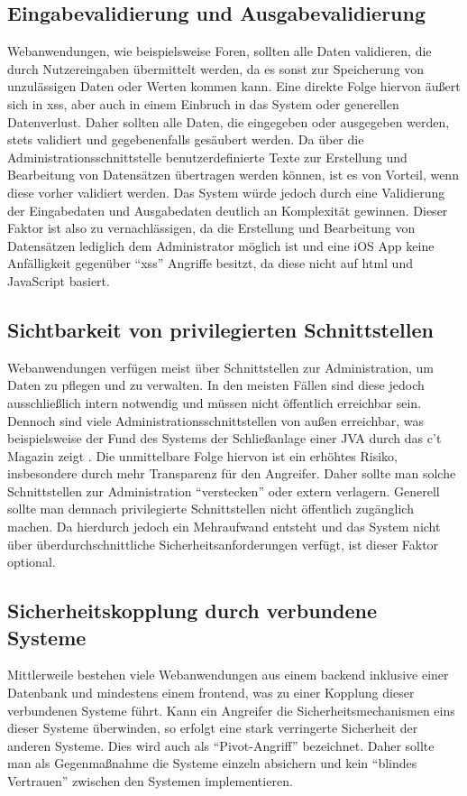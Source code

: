 \subsection{Eingabevalidierung und Ausgabevalidierung}
Webanwendungen, wie beispielsweise Foren, sollten alle Daten validieren, die durch Nutzereingaben übermittelt werden, da es sonst zur Speicherung von unzulässigen Daten oder Werten kommen kann. Eine direkte Folge hiervon äußert sich in \gls{xss}, aber auch in einem Einbruch in das System oder generellen Datenverlust.
Daher sollten alle Daten, die eingegeben oder ausgegeben werden, stets validiert und gegebenenfalls gesäubert werden.
Da über die Administrationsschnittstelle benutzerdefinierte Texte zur Erstellung und Bearbeitung von Datensätzen übertragen werden können, ist es von Vorteil, wenn diese vorher validiert werden. Das System würde jedoch durch eine Validierung der Eingabedaten und Ausgabedaten deutlich an Komplexität gewinnen. Dieser Faktor ist also zu vernachlässigen, da die Erstellung und Bearbeitung von Datensätzen lediglich dem Administrator möglich ist und eine iOS App keine Anfälligkeit gegenüber \enquote{xss} Angriffe besitzt, da diese nicht auf \gls{html} und JavaScript basiert.

\subsection{Sichtbarkeit von privilegierten Schnittstellen}
Webanwendungen verfügen meist über Schnittstellen zur Administration, um Daten zu pflegen und zu verwalten.
In den meisten Fällen sind diese jedoch ausschließlich intern notwendig und müssen nicht öffentlich erreichbar sein.
Dennoch sind viele Administrationsschnittstellen von außen erreichbar, was beispielsweise der Fund des Systems der Schließanlage einer JVA durch das c’t Magazin zeigt \cite[S.~78]{ct}.
Die unmittelbare Folge hiervon ist ein erhöhtes Risiko, insbesondere durch mehr Transparenz für den Angreifer.
Daher sollte man solche Schnittstellen zur Administration \enquote{verstecken} oder extern verlagern.
Generell sollte man demnach privilegierte Schnittstellen nicht öffentlich zugänglich machen. Da hierdurch jedoch ein Mehraufwand entsteht und das System nicht über überdurchschnittliche Sicherheitsanforderungen verfügt, ist dieser Faktor optional.

\subsection{Sicherheitskopplung durch verbundene Systeme}
Mittlerweile bestehen viele Webanwendungen aus einem \gls{backend} inklusive einer Datenbank und mindestens einem \gls{frontend}, was zu einer Kopplung dieser verbundenen Systeme führt. Kann ein Angreifer die Sicherheitsmechanismen eins dieser Systeme überwinden, so erfolgt eine stark verringerte Sicherheit der anderen Systeme. Dies wird auch als \enquote{Pivot-Angriff} bezeichnet.
Daher sollte man als Gegenmaßnahme die Systeme einzeln absichern und kein \enquote{blindes Vertrauen} zwischen den Systemen implementieren.

